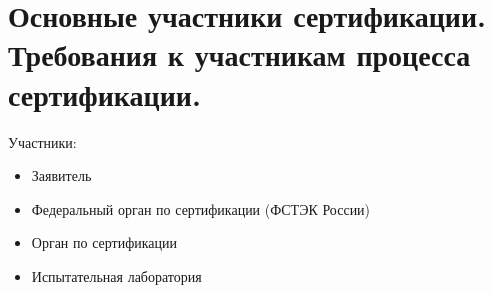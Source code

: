 \section{Основные участники сертификации. Требования к участникам процесса сертификации.}

Участники:
\begin{itemize}
	\item Заявитель
	\item Федеральный орган по сертификации (ФСТЭК России)
	\item Орган по сертификации
	\item Испытательная лаборатория
\end{itemize}
